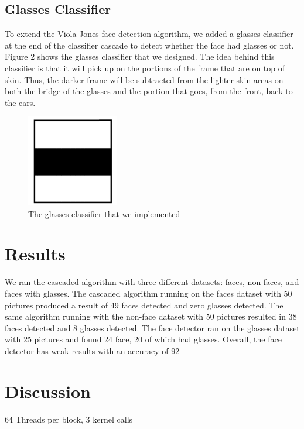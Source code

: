 \documentclass[12pt] {article}
\begin{document}
\subsection{Glasses Classifier}
To extend the Viola-Jones face detection algorithm, we added a glasses classifier at the end of the classifier cascade to detect whether the face had glasses or not. Figure 2 shows the glasses classifier that we designed. The idea behind this classifier is that it will pick up on the portions of the frame that are on top of skin. Thus, the darker frame will be subtracted from the lighter skin areas on both the bridge of the glasses and the portion that goes, from the front, back to the ears.
\begin{figure}[h!]
	\centering
		\includegraphics[width=40mm]{glasses_identifier.pdf}
		\caption{The glasses classifier that we implemented}
\end{figure}

\section{Results}
We ran the cascaded algorithm with three different datasets: faces, non-faces, and faces with glasses. The cascaded algorithm running on the faces dataset with 50 pictures produced a result of 49 faces detected and zero glasses detected. The same algorithm running with the non-face dataset with 50 pictures resulted in 38 faces detected and 8 glasses detected. The face detector ran on the glasses dataset with 25 pictures and found 24 face, 20 of which had glasses. Overall, the face detector has weak results with an accuracy of 92%

\section{Discussion}
64 Threads per block, 3 kernel calls
\end{document}
